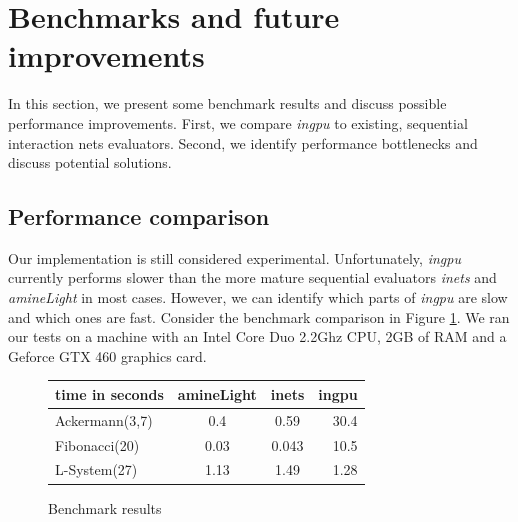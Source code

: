 \documentclass[submission,copyright,creativecommons]{eptcs}
\begin{document}



\section{Benchmarks and future improvements}
\label{sec:benchmarks}


In this section, we present some benchmark results and discuss possible
performance improvements. First, we compare \emph{ingpu} to existing, sequential
interaction nets evaluators. Second, we identify performance bottlenecks and
discuss potential solutions.

\subsection{Performance comparison}
\label{sec:performance-comparison}
Our implementation is still considered experimental. Unfortunately, \emph{ingpu}
currently performs slower than the more mature sequential evaluators
\emph{inets}\cite{inets_project_site} and \emph{amineLight}\cite{DBLP:journals/eceasst/HassanMS10} in most cases.
However, we can identify which parts of \emph{ingpu} are slow and which ones are fast. Consider the benchmark comparison
in Figure \ref{fig:benchmarks}. We ran our tests on a machine with an Intel Core
Duo 2.2Ghz CPU, 2GB of RAM and a Geforce GTX 460 graphics card.

\begin{figure}[hptb]
\begin{center}
\begin{center}
  \begin{tabular}{ l  c  c  r  }
\toprule
    time in seconds & amineLight & inets & ingpu \\
\midrule
    Ackermann(3,7)   & 0.4 & 0.59 & 30.4 \\
    Fibonacci(20)    & 0.03 & 0.043 & 10.5 \\
    L-System(27)     & 1.13 & 1.49 & 1.28 \\
    \bottomrule
  \end{tabular}
\end{center}
  \caption{Benchmark results}
  \label{fig:benchmarks}
\end{center}
\end{figure}
\end{document}

